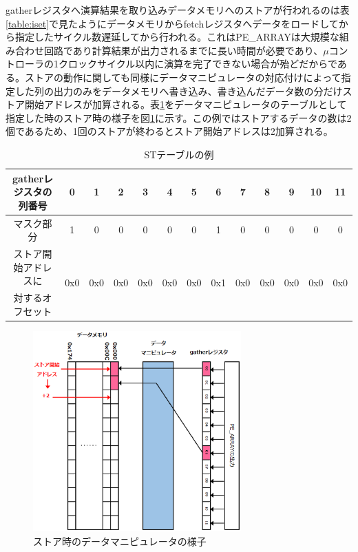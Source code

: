 {gatherレジスタへ演算結果を取り込みデータメモリへのストアが行われるのは表\ref{table:iset}で見たようにデータメモリからfetchレジスタへデータをロードしてから指定したサイクル数遅延してから行われる。これはPE\_ARRAYは大規模な組み合わせ回路であり計算結果が出力されるまでに長い時間が必要であり、$\mu$コントローラの1クロックサイクル以内に演算を完了できない場合が殆どだからである。ストアの動作に関しても同様にデータマニピュレータの対応付けによって指定した列の出力のみをデータメモリへ書き込み、書き込んだデータ数の分だけストア開始アドレスが加算される。表\ref{table:sttbl}をデータマニピュレータのテーブルとして指定した時のストア時の様子を図\ref{fig:ST_dmanu}に示す。この例ではストアするデータの数は2個であるため、1回のストアが終わるとストア開始アドレスは2加算される。

\begin{table}[h]
\centering
\caption{STテーブルの例}
\label{table:sttbl}
\begin{tabular}{|c|c|c|c|c|c|c|c|c|c|c|c|c|} \hline
gatherレジスタの列番号 & 0 & 1 & 2 & 3 & 4 & 5 & 6 & 7 & 8 & 9 & 10 & 11 \\ \hline \hline
マスク部分 & 1 & 0 & 0 & 0 & 0 & 0 & 1 & 0 & 0  & 0 & 0 & 0 \\ \hline
ストア開始アドレスに & \multirow{2}{*}{0x0} & \multirow{2}{*}{0x0} & \multirow{2}{*}{0x0} & \multirow{2}{*}{0x0} & \multirow{2}{*}{0x0} & \multirow{2}{*}{0x0} & \multirow{2}{*}{0x1} & \multirow{2}{*}{0x0} & \multirow{2}{*}{0x0} & \multirow{2}{*}{0x0} & \multirow{2}{*}{0x0} & \multirow{2}{*}{0x0} \\ 
対するオフセット & & & & & & & & & & & & \\ \hline
\end{tabular}
\end{table}

\begin{figure}[h]
\centering
\includegraphics[width=8cm]{./chap4/fig/ST_dmanu.eps}
\caption{ストア時のデータマニピュレータの様子}
\label{fig:ST_dmanu}
\end{figure}


}
